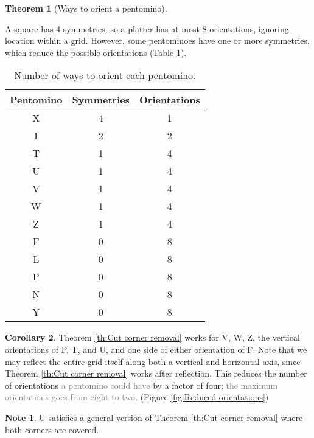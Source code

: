 \documentclass{article}
\theoremstyle{definition}%
\newtheorem{theorem}{Theorem}[section]
\newtheorem{corollary}[theorem]{Corollary}%
\newtheorem*{note}{Note}
\newcommand{\minordetail}[1]{\textcolor{gray}{#1}}
\begin{document}
\begin{theorem}[Ways to orient a pentomino]
\label{th:Pentomino orientations}

A square has 4 symmetries, so a platter has at most 8 orientations, ignoring location within a grid. However, some pentominoes have one or more symmetries, which reduce the possible orientations (Table \ref{tab:pentomino orientations}).

    \begin{table}[htbp]
        \centering
        \caption{Number of ways to orient each pentomino. \cite[0:41]{v1}}
        \begin{tabular}{ccc}
            \toprule
            Pentomino & Symmetries & Orientations \\
            \midrule
            X & 4 & 1 \\
            I & 2 & 2 \\
            T & 1 & 4 \\
            U & 1 & 4 \\
            V & 1 & 4 \\
            W & 1 & 4 \\
            Z & 1 & 4 \\
            F & 0 & 8 \\
            L & 0 & 8 \\
            P & 0 & 8 \\
            N & 0 & 8 \\
            Y & 0 & 8 \\
            \bottomrule
        \end{tabular}
        \label{tab:pentomino orientations}
    \end{table}
\end{theorem}

\begin{corollary}
Theorem \ref{th:Cut corner removal} works for V, W, Z, the vertical orientations of P, T, and U, and one side of either orientation of F. Note that we may reflect the entire grid itself along both a vertical and horizontal axis, since Theorem \ref{th:Cut corner removal} works after reflection. This reduces the number of orientations \minordetail{a pentomino could have} by a factor of four; \minordetail{the maximum orientations goes from eight to two}. (Figure \ref{fig:Reduced orientations})
\end{corollary}

\begin{note}
U satisfies a general version of Theorem \ref{th:Cut corner removal} where both corners are covered.
\end{note}
\end{document}
